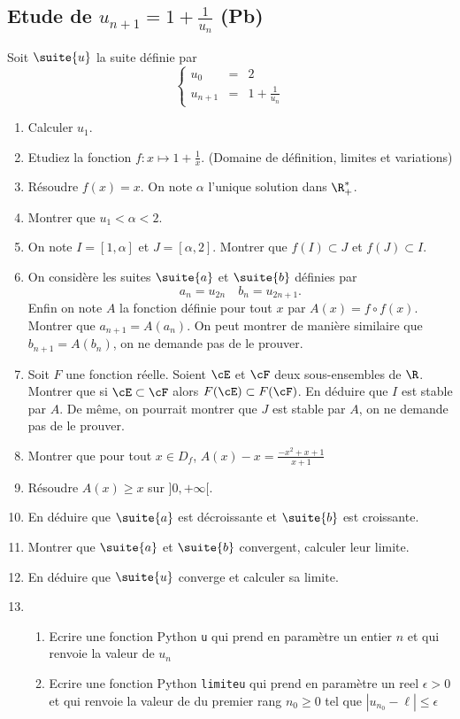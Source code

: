 \subsection{Etude de $u_{n+1} =1 +\frac{1}{u_n}$ (Pb)}


\begin{exercice} 
Soit $\suite{u}$ la suite définie par 
$$\left\{ 
\begin{array}{ccl}
u_0&=&2\\
u_{n+1} &=&1 +\frac{1}{u_n}
\end{array}
\right.$$

\begin{enumerate}
\item Calculer $u_1$.
\item Etudiez la fonction $f: x\mapsto 1+\frac{1}{x}$. (Domaine de définition, limites et variations) 
\item Résoudre $f(x)=x$. On note $\alpha$ l'unique solution dans $\R^*_+$. 
\item Montrer que $u_1<\alpha <2$.
\item On note $I=[1,\alpha]$ et $J=[\alpha,2]$. Montrer que $f(I)\subset J$ et $f(J)\subset I$.
\item On considère les suites $\suite{a}$ et  $\suite{b}$ définies par 
$$a_n=u_{2n} \quad b_n =u_{2n+1}.$$
Enfin on note $A$ la fonction définie pour tout $x$ par $A(x)=f\circ f(x)$.
 Montrer que $a_{n+1} =A (a_n)$. On peut montrer de manière similaire que 
 $b_{n+1} =A(b_n) $, on ne demande pas de le prouver. 
 \item Soit $F$ une fonction réelle. Soient $\cE $ et $\cF$ deux sous-ensembles de $\R$. Montrer que si $\cE\subset \cF$ alors $F(\cE)\subset F(\cF)$. En déduire que  $I$ est stable par $A$. De même, on pourrait montrer que $J$ est stable par $A$, on ne demande pas de le prouver. 
\item Montrer que pour tout $x\in D_f$, $A(x)-x =\frac{-x^2+x+1}{x+1}$ 
\item Résoudre $A(x)\geq x$ sur $]0,+\infty[$. 
\item  En déduire que $\suite{a}$ est décroissante et $\suite{b}$ est croissante. 
\item Montrer que $\suite{a}$ et $\suite{b}$ convergent, calculer leur limite. 
\item En déduire que $\suite{u}$ converge et calculer sa limite. 
\item \begin{enumerate}
\item Ecrire une fonction Python \texttt{u} qui prend en paramètre un entier $n$ et qui renvoie la valeur de $u_n$
\item Ecrire une fonction Python \texttt{limiteu} qui prend en paramètre un reel $\epsilon>0$ et  qui renvoie la valeur de du premier rang $n_0\geq 0$ tel que $|u_{n_0} -\ell|\leq \epsilon$ 
\end{enumerate}

\end{enumerate}

\end{exercice}

